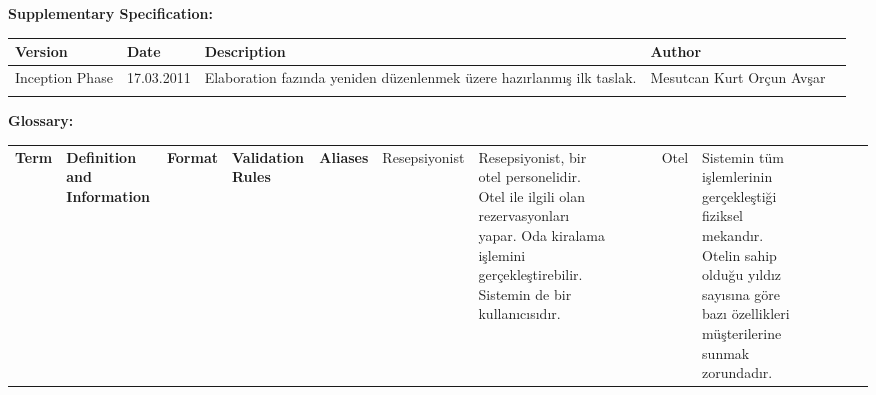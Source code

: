 \documentclass[12pt,a4paper]{report}
\begin{document}


\newpage
{
\bf
Supplementary Specification: \\[1cm]
}
\begin{tabular}{ |p{2.5cm} | p{2cm} | p{7cm} | p{2.7cm} | }

\hline
\bf
Version
&
\bf
Date
&
\bf
Description
&
\bf
Author \\
\hline

Inception Phase
&
17.03.2011
&
Elaboration fazında yeniden düzenlenmek üzere hazırlanmış ilk taslak.
&
Mesutcan Kurt
Orçun Avşar \\
\hline

&

&

&

&

\hline

\end{tabular}

\newpage

{
\bf
Glossary:  \\[1cm]
}
\begin{tabular}{ |p{2.5cm} | p{6cm} | p{2.3cm} | p{3cm} | p{2cm} |}
\hline
\bf
Term
&
\bf
Definition and Information
&
\bf
Format
&
\bf
Validation Rules
&
\bf
Aliases
&
\hline
Resepsiyonist
&
Resepsiyonist, bir otel personelidir. Otel ile ilgili olan rezervasyonları yapar. Oda kiralama işlemini gerçekleştirebilir. Sistemin de bir kullanıcısıdır.
&

&

&

&

\hline 
Otel
&
Sistemin tüm işlemlerinin gerçekleştiği fiziksel mekandır.
Otelin sahip olduğu yıldız sayısına göre bazı özellikleri müşterilerine
sunmak zorundadır.
&
&
&
&

\hline

\end{tabular}
\end{document}
